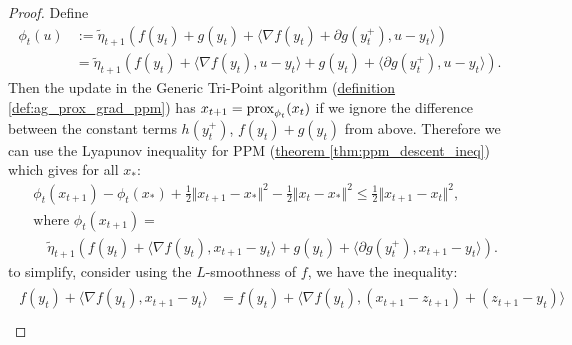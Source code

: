     \begin{proof}
        Define 
        \begin{align*}
            \phi_t(u) &:= 
            \tilde \eta_{t + 1} 
            \left(
                f(y_t) + g(y_t) + \langle \nabla f(y_t) + \partial g(y_t^+), u - y_t\rangle
            \right)\\
            &= 
            \tilde \eta_{t + 1} \left(
                f(y_t) + \langle \nabla f(y_t), u - y_t\rangle + 
                g(y_t) + \langle \partial g(y_t^+), u - y_t\rangle
            \right). 
        \end{align*}
        Then the update in the Generic Tri-Point algorithm 
        (\hyperref[def:ag_prox_grad_ppm]
            {definition \ref*{def:ag_prox_grad_ppm}}) 
        has $x_{t + 1} = \operatorname{prox}_{\phi_t}(x_t)$ if we ignore the difference between the constant terms $h(y_t^+)$, $f(y_t) + g(y_t)$ from above. 
        Therefore we can use the Lyapunov inequality for PPM (\hyperref[thm:ppm_descent_ineq]
            {theorem \ref*{thm:ppm_descent_ineq}})
        which gives for all $x_*$: 
        \begin{align*}
            & \phi_t(x_{t + 1}) - \phi_t(x_*) + 
            \frac{1}{2}\Vert x_{t+1} - x_*\Vert^2 - 
            \frac{1}{2}\Vert x_t - x_*\Vert^2
            \le \frac{1}{2}\Vert x_{t + 1} - x_t\Vert^2, 
            \\
            & \text{where }
            \phi_t(x_{t + 1}) =
            \\
            & \quad 
            \tilde \eta_{t + 1}
            \left(
                f(y_t) + \langle \nabla f(y_t), x_{t + 1} - y_t\rangle + 
                g(y_t) + \langle \partial g(y_t^+), x_{t + 1} - y_t\rangle
            \right). 
        \end{align*}
        to simplify, consider using the $L$-smoothness of $f$, we have the inequality: 
        \begin{align*}
            \begin{aligned}
                f(y_t) + \langle \nabla f(y_t), x_{t + 1} - y_t\rangle
                &=
                f(y_t) + \langle \nabla f(y_t), (x_{t +1} - z_{t + 1}) + (z_{t + 1} - y_t) \rangle
                \\

\end{aligned}
\end{align*}
\end{proof}
